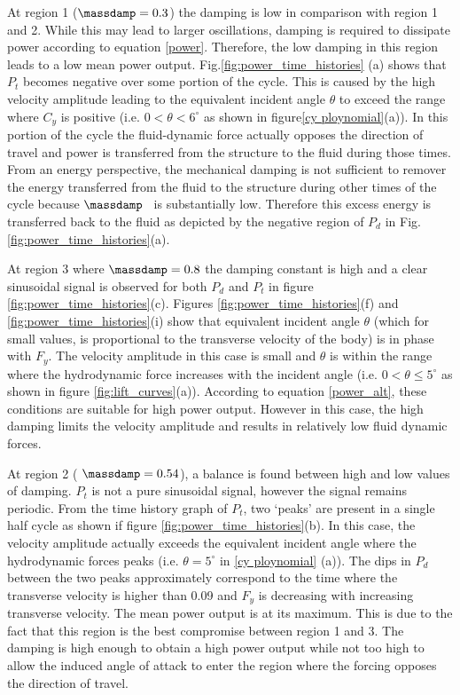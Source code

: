   
  
  
  At region 1 ($\massdamp=0.3$) the damping is low in comparison with region 1 and 2. While this may lead to larger oscillations, damping is required to dissipate power according to equation \ref{power}. Therefore, the low damping in this region leads to a low mean power output. Fig.\ref{fig:power_time_histories} (a) shows that $P_t$ becomes negative over some portion of the cycle. This is caused by the high velocity amplitude leading to the equivalent incident angle $\theta$ to exceed the range where $C_y$ is positive (i.e. $0<\theta<6^\circ$ as shown in figure\ref{cy ploynomial}(a)). In this portion of the cycle the fluid-dynamic force actually opposes the direction of travel and power is transferred from the structure to the fluid during those times. From an energy perspective, the mechanical damping is not sufficient to remover the energy transferred from the fluid to the structure during other times of the cycle because $\massdamp$ \ is substantially low. Therefore this excess energy is transferred back to the fluid as depicted by the negative region of $P_d$ in Fig.\ref{fig:power_time_histories}(a).
 
 

 At region 3 where $\massdamp=0.8$ the damping constant is high and a clear sinusoidal signal is observed for both $P_d$ and $P_t$ in figure \ref{fig:power_time_histories}(c). Figures \ref{fig:power_time_histories}(f) and  \ref{fig:power_time_histories}(i) show that equivalent incident angle $\theta$ (which for small values, is proportional to the transverse velocity of the body) is in phase with $F_y$.  The velocity amplitude in this case is small and $\theta$ is within the range where the hydrodynamic force increases with the incident angle (i.e. $0<\theta \leq 5^\circ$ as shown in figure \ref{fig:lift_curves}(a)). According to equation \ref{power_alt}, these conditions are suitable for high power output. However in this case, the high damping limits the velocity amplitude and results in relatively low fluid dynamic forces.
 
  
 At region 2 ( $\massdamp=0.54$), a balance is found between high and low values of damping. $P_t$ is not a pure sinusoidal signal, however the signal remains periodic. From the time history graph of $P_t$, two `peaks' are present in a single half cycle as shown if figure \ref{fig:power_time_histories}(b). In this case, the velocity amplitude actually exceeds the equivalent incident angle where the hydrodynamic forces peaks (i.e. $\theta=5^\circ$ in \ref{cy ploynomial} (a)). The dips in $P_d$ between the two peaks approximately correspond to the time where the transverse velocity is higher than 0.09 and $F_y$ is decreasing with increasing transverse velocity. The mean power output is at its maximum. This is due to the fact that this region is the best compromise between region 1 and 3. The damping is high enough to obtain a high power output while not too high to allow the induced angle of attack to enter the region where the forcing opposes the direction of travel. 
 
